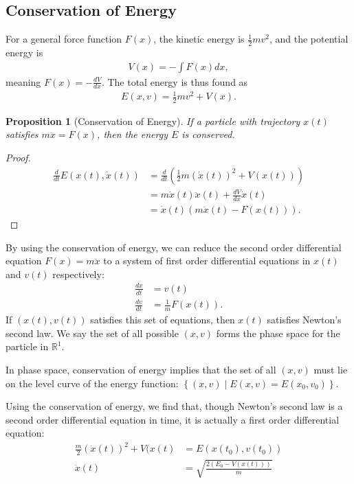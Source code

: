 \documentclass[10pt]{extarticle}
\newcommand{\R}{\mathbb{R}}
\newcommand{\set}[1]{\left\{#1\right\}}
\theoremstyle{plain}
\newtheorem*{proposition}{Proposition}%
\theoremstyle{definition}
\theoremstyle{remark}
\renewcommand{\newline}{\hfill\break}
\begin{document}
  \subsection{Conservation of Energy}%
  For a general force function $F(x)$, the kinetic energy is $\frac{1}{2}mv^2$, and the potential energy is
  \begin{align*}
    V(x) = -\int F(x)dx,
  \end{align*}
  meaning $F(x) = -\frac{dV}{dx}$. The total energy is thus found as
  \begin{align*}
    E(x,v) = \frac{1}{2}mv^2 + V(x).
  \end{align*}
  \begin{proposition}[Conservation of Energy]
  If a particle with trajectory $x(t)$ satisfies $m\ddot{x} = F(x)$, then the energy $E$ is conserved.
  \end{proposition}
  \begin{proof}
    \begin{align*}
      \frac{d}{dt}E(x(t),\dot{x}(t)) &= \frac{d}{dt}\left(\frac{1}{2}m(\dot{x}(t))^2 + V(x(t))\right)\\
                                     &= m\dot{x}(t)\ddot{x}(t) + \frac{dV}{dx}\dot{x}(t)\\
                                     &= \dot{x}(t)\left(m\ddot{x}(t) - F(x(t))\right).
    \end{align*}
  \end{proof}
  By using the conservation of energy, we can reduce the second order differential equation $F(x) = m\ddot{x}$ to a system of first order differential equations in $x(t)$ and $v(t)$ respectively:
  \begin{align*}
    \frac{dx}{dt} &= v(t)\\
    \frac{dv}{dt} &= \frac{1}{m}F(x(t)).
  \end{align*}
  If $(x(t),v(t))$ satisfies this set of equations, then $x(t)$ satisfies Newton's second law. We say the set of all possible $(x,v)$ forms the phase space for the particle in $\R^1$.\newline

  In phase space, conservation of energy implies that the set of all $(x,v)$ must lie on the level curve of the energy function: $\set{(x,v)\mid E(x,v) = E(x_0,v_0)}$.\newline

  Using the conservation of energy, we find that, though Newton's second law is a second order differential equation in time, it is actually a first order differential equation:
  \begin{align*}
    \frac{m}{2}\left(\dot{x}(t)\right)^2 + V(x(t) &= E(x(t_0),v(t_0))\\
    \dot{x}(t) &= \sqrt{\frac{2(E_0 - V(x(t)))}{m}}
  \end{align*}
\end{document}
